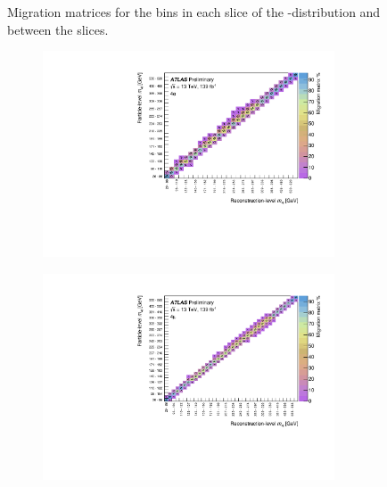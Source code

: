\begin{figure}[htb]
\caption{Migration matrices for the \mFourL bins in each \yFourL slice of the \mFourL-\yFourL distribution and between the slices.}
 \end{figure}

\FloatBarrier
\clearpage

\begin{figure}[htb]
  \centering
  \begin{subfigure}{.49\textwidth}\centering\includegraphics[width = 0.95\textwidth]{Figures/m4l/UnfoldingStudies/v014_matrices/m4l_event_type0-1Matrix.pdf}\end{subfigure}
  \begin{subfigure}{.49\textwidth}\centering\includegraphics[width = 0.95\textwidth]{Figures/m4l/UnfoldingStudies/v014_matrices/m4l_event_type0-0Matrix.pdf}\end{subfigure}

\end{figure}

